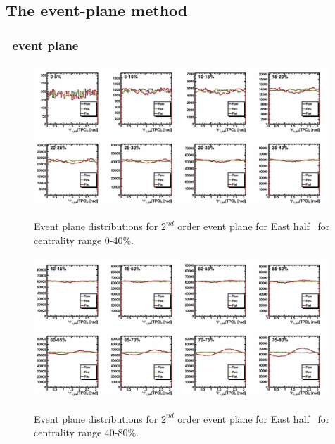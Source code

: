 \FloatBarrier
\subsection{The event-plane method}

\FloatBarrier
\subsubsection{\TPC\ event plane}

\begin{figure}[ht]
    \includegraphics[width=0.99\textwidth]{Figures/PsiEast_harm0_0.png}
    \label{fig:BBC_East_EP1}
    \caption{Event plane distributions for $2^{nd}$ order event plane for East half \TPC\ for centrality range 0-40\%.}
\end{figure}

\begin{figure}[ht]
    \includegraphics[width=0.99\textwidth]{Figures/PsiEast_harm0_1.png}
    \label{fig:BBC_East_EP2}
    \caption{Event plane distributions for $2^{nd}$ order event plane for East half \TPC\ for centrality range 40-80\%.}
\end{figure}

